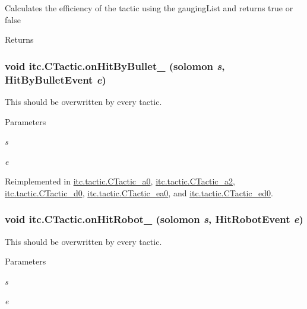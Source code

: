 \label{classitc_1_1_c_tactic_aefcf5f13687e17eaa8bf5dd4be3b424b}
Calculates the efficiency of the tactic using the gaugingList and returns true or false \begin{DoxyReturn}{Returns}

\end{DoxyReturn}
\hypertarget{classitc_1_1_c_tactic_a9a8d125f826667459758f2767c3bd957}{
\subsubsection[{onHitByBullet\_\-}]{\setlength{\rightskip}{0pt plus 5cm}void itc.CTactic.onHitByBullet\_\- ({\bf solomon} {\em s}, \/  HitByBulletEvent {\em e})}}
\label{classitc_1_1_c_tactic_a9a8d125f826667459758f2767c3bd957}
This should be overwritten by every tactic. 
\begin{DoxyParams}{Parameters}
\item[{\em s}]\item[{\em e}]\end{DoxyParams}


Reimplemented in \hyperlink{classitc_1_1tactic_1_1_c_tactic__a0_a8911e3200cb13cfab22082c0a718c0b9}{itc.tactic.CTactic\_\-a0}, \hyperlink{classitc_1_1tactic_1_1_c_tactic__a2_a774862588c2b010b16e2709d922db24d}{itc.tactic.CTactic\_\-a2}, \hyperlink{classitc_1_1tactic_1_1_c_tactic__d0_a4af101273ae2df9ee3c58641e1b1e422}{itc.tactic.CTactic\_\-d0}, \hyperlink{classitc_1_1tactic_1_1_c_tactic__ea0_a66859754a34c07f83a114509a86914cb}{itc.tactic.CTactic\_\-ea0}, and \hyperlink{classitc_1_1tactic_1_1_c_tactic__ed0_ad04cdcbec1998d1c7bee55a9dc959505}{itc.tactic.CTactic\_\-ed0}.\hypertarget{classitc_1_1_c_tactic_a19cf73207948eff2c6db7d90fce8bd55}{
\subsubsection[{onHitRobot\_\-}]{\setlength{\rightskip}{0pt plus 5cm}void itc.CTactic.onHitRobot\_\- ({\bf solomon} {\em s}, \/  HitRobotEvent {\em e})}}
\label{classitc_1_1_c_tactic_a19cf73207948eff2c6db7d90fce8bd55}
This should be overwritten by every tactic. 
\begin{DoxyParams}{Parameters}
\item[{\em s}]\item[{\em e}]\end{DoxyParams}


